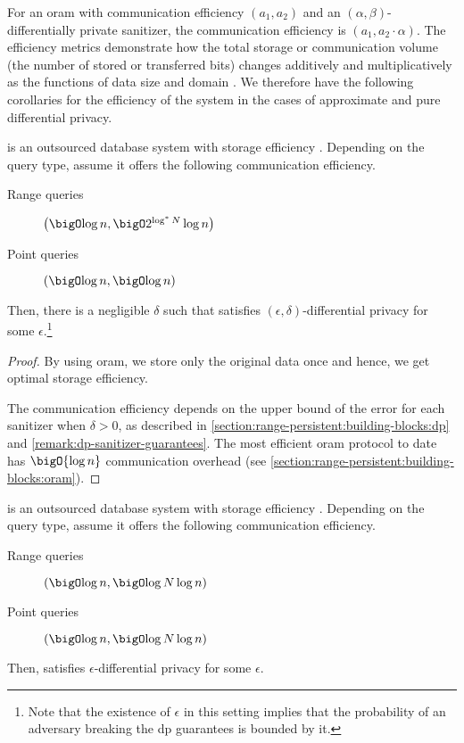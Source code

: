 		For an \acrshort{oram} with communication efficiency $(a_1, a_2)$ and an $(\alpha, \beta)$-differentially private sanitizer, the \epsolute{} communication efficiency is $(a_1, a_2 \cdot \alpha)$.
		The efficiency metrics demonstrate how the total storage or communication volume (the number of stored or transferred bits) changes additively and multiplicatively as the functions of data size \dataSize{} and domain \domainSize{}.
		We therefore have the following corollaries for the efficiency of the system in the cases of approximate and pure differential privacy.
		\begin{corollary}\label{corollary:comm-efficiency-approximate-dp}
			\epsolute{} is an outsourced database system with storage efficiency .
			Depending on the query type, assume it offers the following communication efficiency.
			\begin{description}
				\item[Range queries] $\efficiency{\log \dataSize}{2^{\log^* \domainSize} \log \dataSize}$
				\item[Point queries] $\efficiency{\log \dataSize}{\log \dataSize}$
			\end{description}
			Then, there is a negligible $\delta$ such that \epsolute{} satisfies $(\epsilon, \delta)$\hyp{}differential privacy for some $\epsilon$.\footnote{
				Note that the existence of $\epsilon$ in this setting implies that the probability of an adversary breaking the \acrshort{dp} guarantees is bounded by it.
			}
		\end{corollary}

		\begin{proof}
			By using \acrshort{oram}, we store only the original data once and hence, we get optimal storage efficiency.

			The communication efficiency depends on the upper bound of the error for each sanitizer when $\delta > 0$, as described in \cref{section:range-persistent:building-blocks:dp} and \cref{remark:dp-sanitizer-guarantees}.
			The most efficient \acrshort{oram} protocol to date has $\bigO{\log \dataSize}$ communication overhead (see \cref{section:range-persistent:building-blocks:oram}).
		\end{proof}

		\begin{corollary}\label{corollary:comm-efficiency-pure-dp}
			\epsolute{} is an outsourced database system with storage efficiency .
			Depending on the query type, assume it offers the following communication efficiency.
			\begin{description}
				\item[Range queries] $\efficiency{\log \dataSize}{\log \domainSize \log \dataSize}$
				\item[Point queries] $\efficiency{\log \dataSize}{\log \domainSize \log \dataSize}$
			\end{description}
			Then, \epsolute{} satisfies $\epsilon$-differential privacy for some $\epsilon$.
		\end{corollary}

